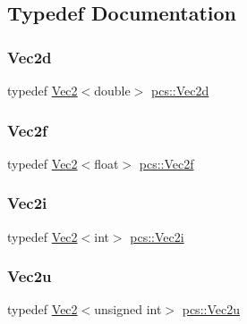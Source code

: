 \subsection{Typedef Documentation}
\mbox{\label{namespacepcs_acc216b704c01ee5f725075dabe53e085}} 
\subsubsection{\texorpdfstring{Vec2d}{Vec2d}}
{\footnotesize\ttfamily typedef \hyperlink{structpcs_1_1Vec2}{Vec2}$<$double$>$ \hyperlink{namespacepcs_acc216b704c01ee5f725075dabe53e085}{pcs\+::\+Vec2d}}

\mbox{\label{namespacepcs_a4b2fd718bd0800b6aa492b1c60f19edc}} 
\subsubsection{\texorpdfstring{Vec2f}{Vec2f}}
{\footnotesize\ttfamily typedef \hyperlink{structpcs_1_1Vec2}{Vec2}$<$float$>$ \hyperlink{namespacepcs_a4b2fd718bd0800b6aa492b1c60f19edc}{pcs\+::\+Vec2f}}

\mbox{\label{namespacepcs_af322f6d2ecaff325ab1ab8d243e1bc02}} 
\subsubsection{\texorpdfstring{Vec2i}{Vec2i}}
{\footnotesize\ttfamily typedef \hyperlink{structpcs_1_1Vec2}{Vec2}$<$int$>$ \hyperlink{namespacepcs_af322f6d2ecaff325ab1ab8d243e1bc02}{pcs\+::\+Vec2i}}

\mbox{\label{namespacepcs_a3765be05787916d050ad7203dd4a9064}} 
\subsubsection{\texorpdfstring{Vec2u}{Vec2u}}
{\footnotesize\ttfamily typedef \hyperlink{structpcs_1_1Vec2}{Vec2}$<$unsigned int$>$ \hyperlink{namespacepcs_a3765be05787916d050ad7203dd4a9064}{pcs\+::\+Vec2u}}

\mbox{\label{namespacepcs_ad162884a2f34ac8048b26b5393a41981}} 
